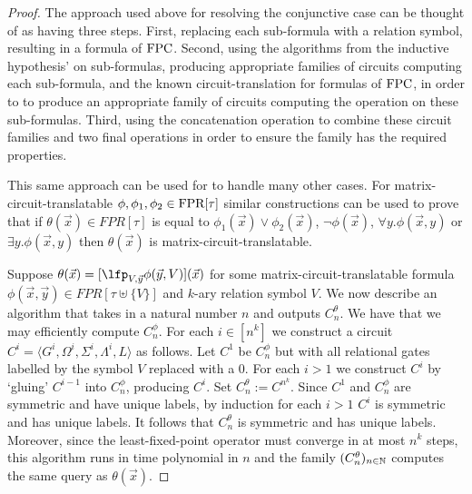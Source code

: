 \documentclass[../paper.tex]{subfiles}
\begin{document}
\begin{proof}

  The approach used above for resolving the conjunctive case can be thought of
  as having three steps. First, replacing each sub-formula with a relation
  symbol, resulting in a formula of $\text{\upshape FPC}$. Second, using the algorithms from
  the inductive hypothesis' on sub-formulas, producing appropriate families of
  circuits computing each sub-formula, and the known circuit-translation for
  formulas of $\text{\upshape FPC}$, in order to to produce an appropriate family of circuits
  computing the operation on these sub-formulas. Third, using the concatenation
  operation to combine these circuit families and two final operations in order
  to ensure the family has the required properties.
  
  This same approach can be used for to handle many other cases. For
  matrix-circuit-translatable $\phi, \phi_1, \phi_2 \in \text{\upshape FPR}[\tau]$ similar
  constructions can be used to prove that if $\theta(\vec{x}) \in FPR[\tau]$ is
  equal to $\phi_1(\vec{x}) \lor \phi_2(\vec{x})$, $\neg \phi(\vec{x})$,
  $\forall y. \phi (\vec{x}, y)$ or $\exists y. \phi (\vec{x}, y)$ then
  $\theta(\vec{x})$ is matrix-circuit-translatable.

  Suppose $\theta(\vec{x}) = [\lfp_{V, \vec{y}} \phi(\vec{y}, V)](\vec{x})$ for
  some matrix-circuit-translatable formula $\phi(\vec{x}, \vec{y}) \in FPR[\tau
  \uplus \{V\}]$ and $k$-ary relation symbol $V$. We now describe an algorithm
  that takes in a natural number $n$ and outputs $C^{\theta}_n$. We have that we
  may efficiently compute $C^{\phi}_n$. For each $i \in [n^k]$ we construct a
  circuit $C^i = \langle G^i, \Omega^i, \Sigma^i, \Lambda^i, L \rangle $ as
  follows. Let $C^1$ be $C^{\phi}_n$ but with all relational gates labelled by
  the symbol $V$ replaced with a $0$. For each $i>1$ we construct $C^{i}$ by
  `gluing' $C^{i-1}$ into $C^\phi_n$, producing $C^i$. Set $C^{\theta}_n :=
  C^{n^k}$. Since $C^1$ and $C^\phi_n$ are symmetric and have unique labels, by
  induction for each $i > 1$ $C^i$ is symmetric and has unique labels. It
  follows that $C^{\theta}_n$ is symmetric and has unique labels. Moreover,
  since the least-fixed-point operator must converge in at most $n^k$ steps,
  this algorithm runs in time polynomial in $n$ and the family
  $(C^{\theta}_n)_{n \in \mathbb{N}}$ computes the same query as $\theta(\vec{x})$.


\end{proof}
\end{document}
